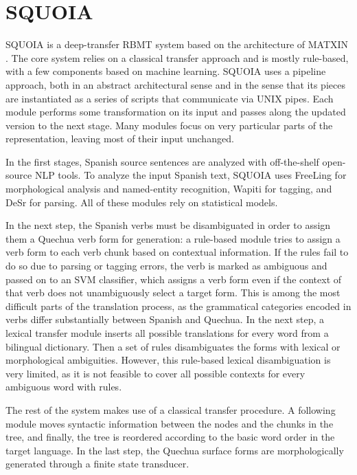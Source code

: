 \documentclass[10pt, a4paper]{article}
\begin{document}
\section{SQUOIA}
SQUOIA is a deep-transfer RBMT system based on the
architecture of MATXIN \cite{matxin_2005,matxin}.
The core system relies on a classical transfer approach and is mostly
rule-based, with a few components based on machine learning.
SQUOIA uses a pipeline approach, both in an abstract architectural sense and in
the sense that its pieces are instantiated as a series of scripts that communicate
via UNIX pipes. Each module performs some transformation on its input and
passes along the updated version to the next stage. Many modules focus on very
particular parts of the representation, leaving most of their input unchanged.

In the first stages, Spanish source sentences are analyzed with off-the-shelf
open-source NLP tools. To analyze the input Spanish text,
SQUOIA uses FreeLing \cite{padro12} for morphological analysis and named-entity
recognition,
Wapiti \cite{lavergne2010practical} for tagging,
and DeSr \cite{attardi-EtAl:2007:EMNLP-CoNLL2007} for parsing.
All of these modules rely on statistical models.

In the next step, the Spanish verbs must be disambiguated in order to assign
them a Quechua verb form for generation: a rule-based module tries to assign a
verb form to each verb chunk based on contextual information. If the rules fail to
do so due to parsing or tagging errors, the verb is marked as ambiguous and
passed on to an SVM classifier, which assigns a verb form even if the context
of that verb does not unambiguously select a target form. This is among the
most difficult parts of the
translation process, as the grammatical categories encoded in verbs differ
substantially between Spanish and Quechua. In the next step, a lexical transfer
module inserts all possible translations for every word from a bilingual dictionary.
Then a set of rules disambiguates the forms with lexical or morphological
ambiguities. However, this rule-based lexical disambiguation is very limited,
as it is not feasible to cover all possible contexts for every ambiguous word
with rules.

The rest of the system makes use of a classical transfer procedure. A following module
moves syntactic information between the nodes and the chunks in the tree, and
finally, the tree is reordered according to the basic word order in the target
language. In the last step, the Quechua surface forms are morphologically
generated through a finite state transducer.
\end{document}
